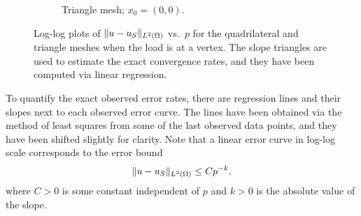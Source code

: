 \documentclass[english, 12pt, a4paper, sci, utf8, a-2b, online]{aaltothesis}
\theoremstyle{definition}
\theoremstyle{plain}
\DeclarePairedDelimiter\norm{\lVert}{\rVert}
\numberwithin{equation}{section}
\begin{document}
\begin{figure}[b]
\begin{subfigure}[t]{0.475\textwidth}
        \caption{Triangle mesh; $x_0 = (0,0)$.}
        \label{fig:L2_errors_node_b}
    \end{subfigure}
    \caption{Log-log plots of $\norm{u - u_S}_{L^2(\Omega)}$ vs.~$p$ for the quadrilateral and triangle meshes when the load is at a vertex. The slope triangles are used to estimate the exact convergence rates, and they have been computed via linear regression.}
    \label{fig:L2_errors_node}
\end{figure}

To quantify the exact observed error rates,
there are regression lines and their slopes next to each observed error curve.
The lines have been obtained via the method of least squares
from some of the last observed data points, and they have been shifted slightly for clarity.
Note that a linear error curve in log-log scale corresponds to the error bound
\begin{align*}
    \norm{u - u_S}_{L^2(\Omega)} \leq C p^{-k},
\end{align*}
where $C > 0$ is some constant independent of $p$ and $k > 0$ is the absolute value of the slope.
\end{document}
